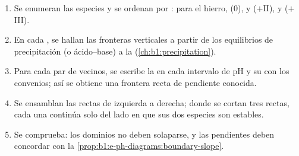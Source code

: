 \begin{method}\label{met:b1:e-ph-diagrams:build}
\begin{enumerate}
  \item Se enumeran las especies y se ordenan por :
        para el hierro,  (0),  y  ($+$II),
         y  ($+$III).
  \item En cada , se hallan las fronteras verticales a
        partir de los equilibrios de precipitación (o ácido--base) a la
         (\cref{ch:b1:precipitation}).
  \item Para cada par de  vecinos, se escribe la
         en cada intervalo de pH y su  con
        los convenios; así se obtiene una frontera recta de pendiente
        conocida.
  \item Se ensamblan las rectas de izquierda a derecha; donde se cortan
        tres rectas, cada una continúa solo del lado en que sus dos
        especies son estables.
  \item Se comprueba: los dominios no deben solaparse, y las pendientes
        deben concordar con la
        \cref{prop:b1:e-ph-diagrams:boundary-slope}.
\end{enumerate}
\end{method}

